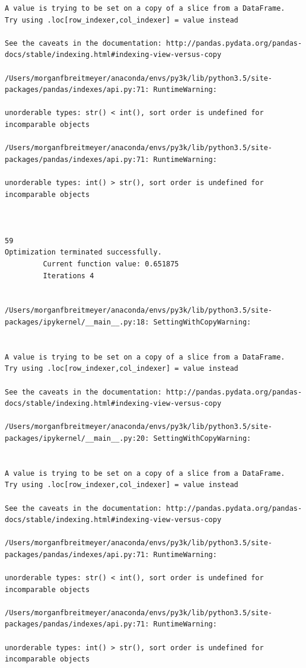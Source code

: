 \begin{lstlisting}
A value is trying to be set on a copy of a slice from a DataFrame.
Try using .loc[row_indexer,col_indexer] = value instead

See the caveats in the documentation: http://pandas.pydata.org/pandas-docs/stable/indexing.html#indexing-view-versus-copy

/Users/morganfbreitmeyer/anaconda/envs/py3k/lib/python3.5/site-packages/pandas/indexes/api.py:71: RuntimeWarning:

unorderable types: str() < int(), sort order is undefined for incomparable objects

/Users/morganfbreitmeyer/anaconda/envs/py3k/lib/python3.5/site-packages/pandas/indexes/api.py:71: RuntimeWarning:

unorderable types: int() > str(), sort order is undefined for incomparable objects



59
Optimization terminated successfully.
         Current function value: 0.651875
         Iterations 4


/Users/morganfbreitmeyer/anaconda/envs/py3k/lib/python3.5/site-packages/ipykernel/__main__.py:18: SettingWithCopyWarning:


A value is trying to be set on a copy of a slice from a DataFrame.
Try using .loc[row_indexer,col_indexer] = value instead

See the caveats in the documentation: http://pandas.pydata.org/pandas-docs/stable/indexing.html#indexing-view-versus-copy

/Users/morganfbreitmeyer/anaconda/envs/py3k/lib/python3.5/site-packages/ipykernel/__main__.py:20: SettingWithCopyWarning:


A value is trying to be set on a copy of a slice from a DataFrame.
Try using .loc[row_indexer,col_indexer] = value instead

See the caveats in the documentation: http://pandas.pydata.org/pandas-docs/stable/indexing.html#indexing-view-versus-copy

/Users/morganfbreitmeyer/anaconda/envs/py3k/lib/python3.5/site-packages/pandas/indexes/api.py:71: RuntimeWarning:

unorderable types: str() < int(), sort order is undefined for incomparable objects

/Users/morganfbreitmeyer/anaconda/envs/py3k/lib/python3.5/site-packages/pandas/indexes/api.py:71: RuntimeWarning:

unorderable types: int() > str(), sort order is undefined for incomparable objects




\end{lstlisting}
